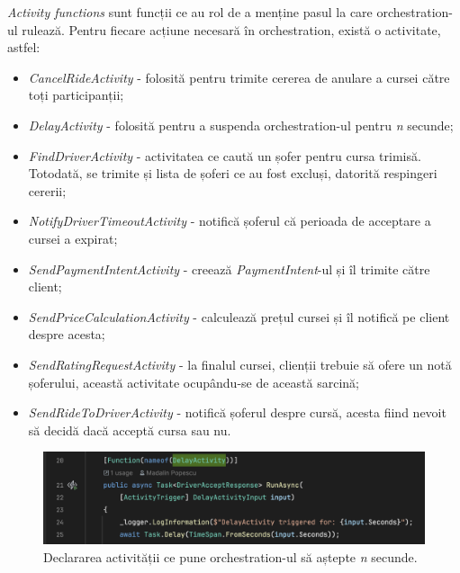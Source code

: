 \textit{Activity functions} sunt funcții ce au rol de a menține pasul la care orchestration-ul rulează.
Pentru fiecare acțiune necesară în orchestration, există o activitate, astfel:
\begin{itemize}
    \item \textit{CancelRideActivity} - folosită pentru trimite cererea de anulare a cursei către toți participanții;
    \item \textit{DelayActivity} - folosită pentru a suspenda orchestration-ul pentru \textit{n} secunde;
    \item \textit{FindDriverActivity} - activitatea ce caută un șofer pentru cursa trimisă. Totodată, se trimite și lista de șoferi ce au fost excluși, datorită respingeri cererii;
    \item \textit{NotifyDriverTimeoutActivity} - notifică șoferul că perioada de acceptare a cursei a expirat;
    \item \textit{SendPaymentIntentActivity} - creează \textit{PaymentIntent}-ul și îl trimite către client;
    \item \textit{SendPriceCalculationActivity} - calculează prețul cursei și îl notifică pe client despre acesta;
    \item \textit{SendRatingRequestActivity} - la finalul cursei, clienții trebuie să ofere un notă șoferului, această activitate ocupându-se de această sarcină;
    \item \textit{SendRideToDriverActivity} - notifică șoferul despre cursă, acesta fiind nevoit să decidă dacă acceptă cursa sau nu.
\end{itemize}

\begin{figure}[H]
    \centering
    \includegraphics[width=14cm]{Assets/activities.png}
    \caption{Declararea activității ce pune orchestration-ul să aștepte \textit{n} secunde.}
    \label{fig:activities}
\end{figure}

